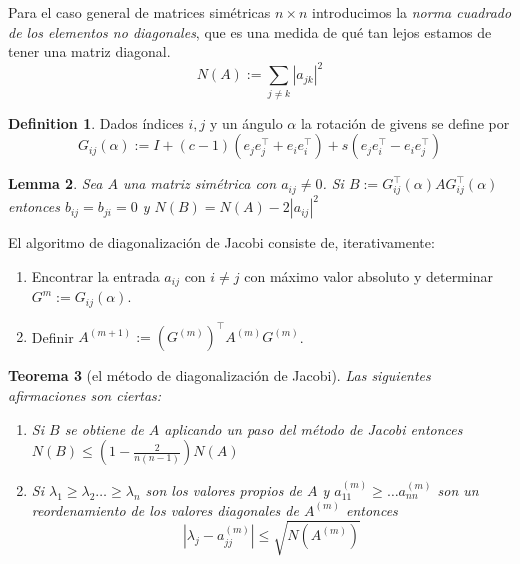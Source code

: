 \documentclass[12pt]{amsart}
\newtheorem{lemma}{Lemma}[section]
\newtheorem{theorem}[lemma]{Teorema}
\theoremstyle{definition}
\newtheorem{definition}[lemma]{Definition}
\renewcommand{\geq}{\geqslant}
\renewcommand{\leq}{\leqslant}
\begin{document}
Para el caso general de matrices simétricas $n\times n$ introducimos la \emph{norma cuadrado de los elementos no diagonales}, que es una medida de qué tan lejos estamos de tener una matriz diagonal.
\[N(A):=\sum_{j\neq k}|a_{jk}|^2\]

\begin{definition} Dados índices $i,j$ y un ángulo $\alpha$ la rotación de givens se define por
\[G_{ij}(\alpha):=I+(c-1)(e_je_j^\top +e_ie_i^\top)+s(e_je_i^\top-e_ie_j^\top)\]
\end{definition}

\begin{lemma} Sea $A$ una matriz simétrica con $a_{ij}\neq 0$. Si $B:=G_{ij}^{\top}(\alpha)AG_{ij}^{\top}(\alpha)$ entonces $b_{ij}=b_{ji}=0$ y $N(B)=N(A)-2|a_{ij}|^2$
\end{lemma}

El algoritmo de diagonalización de Jacobi consiste de, iterativamente:
\begin{enumerate}
\item Encontrar la entrada $a_{ij}$ con $i\neq j$ con máximo valor absoluto y determinar $G^{m}:=G_{ij}(\alpha)$.
\item Definir $A^{(m+1)}:=(G^{(m)})^\top A^{(m)}G^{(m)}$.  
\end{enumerate}

\begin{theorem} [el método de diagonalización de Jacobi] Las siguientes afirmaciones son ciertas:
\begin{enumerate}
\item Si $B$ se obtiene de $A$ aplicando un paso del método de Jacobi entonces $N(B)\leq (1-\frac{2}{n(n-1)})N(A)$
\item Si $\lambda_1\geq \lambda_2\dots\geq \lambda_n$ son los valores propios de $A$ y $a_{11}^{(m)}\geq \dots a_{nn}^{(m)}$ son un reordenamiento de los valores diagonales de $A^{(m)}$ entonces
\[|\lambda_j-a_{jj}^{(m)}|\leq \sqrt{N(A^{(m)})}\]
\end{enumerate}

\end{theorem}
\end{document}
